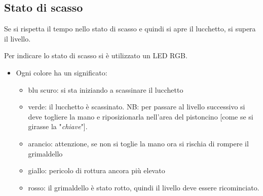 \subsection{Stato di scasso}
Se si rispetta il tempo nello stato di scasso e quindi si apre il lucchetto, si supera il livello.

Per indicare lo stato di scasso si è utilizzato un LED RGB. 
\begin{itemize}
	\item Ogni colore ha un significato:
	\begin{itemize}
		\item blu scuro: si sta iniziando a scassinare il lucchetto
		\item verde: il lucchetto è scassinato.
			\subitem NB: per passare al livello successivo si deve togliere la mano e riposizionarla nell'area del pistoncino [come se si girasse la "\textit{chiave}"].
		\item arancio: attenzione, se non si toglie la mano ora si rischia di rompere il grimaldello
		\item giallo: pericolo di rottura ancora più elevato
		\item rosso: il grimaldello è stato rotto, quindi il livello deve essere ricominciato.
	\end{itemize}
\end{itemize}